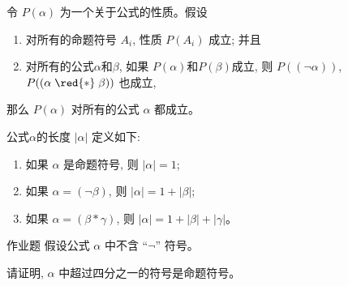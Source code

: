 \begin{frame}{}
  \begin{theorem}[归纳原理]
    令 $P(\alpha)$ 为一个关于公式的性质。假设
    \begin{enumerate}[(1)]
      \setlength{\itemsep}{8pt}
      \item 对所有的命题符号 $A_{i}$, 性质 $P(A_{i})$ 成立; 并且
      \item 对所有的公式$\alpha$和$\beta$, 如果 $P(\alpha)$和$P(\beta)$成立,
        则 $P((\lnot \alpha))$, $P((\alpha \;\red{\ast}\; \beta))$ 也成立,
    \end{enumerate}
    那么 $P(\alpha)$ 对所有的公式 $\alpha$ 都成立。
  \end{theorem}
\end{frame}

\begin{frame}{}
  \begin{definition}[公式的长度]
    公式$\alpha$的长度 $|\alpha|$ 定义如下:
    \begin{enumerate}[(1)]
      \setlength{\itemsep}{8pt}
      \item 如果 $\alpha$ 是命题符号, 则 $|\alpha| = 1$;
      \item 如果 $\alpha = (\lnot \beta)$, 则 $|\alpha| = 1 + |\beta|$;
      \item 如果 $\alpha = (\beta \ast \gamma)$, 则 $|\alpha| = 1 + |\beta| + |\gamma|$。
    \end{enumerate}
  \end{definition}

  \pause
  \vspace{0.30cm}
  \begin{exampleblock}{作业题}
    假设公式 $\alpha$ 中不含 ``$\lnot$'' 符号。

    请证明, $\alpha$ 中超过四分之一的符号是命题符号。
  \end{exampleblock}
\end{frame}

